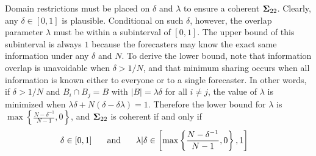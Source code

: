 \documentclass[12pt]{article}
\theoremstyle{definition}
\theoremstyle{definition}
\begin{document}
Domain restrictions must be placed on $\delta$ and $\lambda$ to ensure a coherent ${\bf\Sigma}_{22}$. Clearly, any $\delta \in [0,1]$ is plausible. Conditional on such $\delta$, however, the overlap parameter $\lambda$ must be within a subinterval of $[0,1]$. The upper bound of this subinterval is always $1$ because the 
forecasters may know the exact same information under any $\delta$ and $N$. To derive the lower bound, note that  
information overlap is unavoidable when $\delta > 1/N$, and that minimum
sharing occurs when all information is known either to everyone or
to a single forecaster.  In other words, if $\delta > 1/N$ and
$B_{i} \cap B_j = B$ with $|B| = \lambda \delta$ for all $i \neq j$,
the value of $\lambda$ is minimized when $\lambda\delta + N(\delta -
\delta\lambda) = 1$.  Therefore the lower bound for $\lambda$ is $\max
\left\{ \frac{N-\delta^{-1}}{N-1}, 0\right\}$, and ${\bf\Sigma}_{22}$ is
coherent if and only if
\begin{align}
\delta \in [0,1]  \hspace{0.2in} \mbox{ and } 
  \hspace{0.2in}   \lambda | \delta &\in \left[  
   \max \left\{ \frac{N-\delta^{-1}}{N-1}, 0\right\}, 1 \right] 
   \label{rhoDomain}
\end{align}
\end{document}
